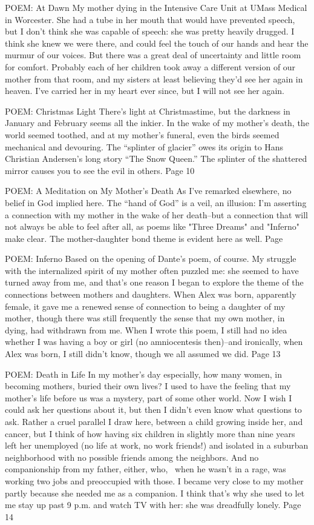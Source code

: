 POEM: At Dawn
My mother dying in the Intensive Care Unit at UMass Medical in Worcester. She had a tube in her mouth that would have prevented speech, but I don't think she was capable of speech: she was pretty heavily drugged. I think she knew we were there, and could feel the touch of our hands and hear the murmur of our voices. But there was a great deal of uncertainty and little room for comfort. Probably each of her children took away a different version of our mother from that room, and my sisters at least believing they'd see her again in heaven. I've carried her in my heart ever since, but I will not see her again. \pageref{chap:nxref:1}

POEM: Christmas Light
There's light at Christmastime, but the darkness in January and February seems all the inkier. In the wake of my mother's death, the world seemed toothed, and at my mother's funeral, even the birds seemed mechanical and devouring. The ``splinter of glacier'' owes its origin to Hans Christian Andersen's long story ``The Snow Queen.'' The splinter of the shattered mirror causes you to see the evil in others.
Page 10

POEM: A Meditation on My Mother's Death
As I've remarked elsewhere, no belief in God implied here. The ``hand of God'' is a veil, an illusion: I'm asserting a connection with my mother in the wake of her death--but a connection that will not always be able to feel after all, as poems like "Three Dreams" and "Inferno" make clear. The mother-daughter bond theme is evident here as well. Page \pageref{ch:ameditation}

POEM: Inferno
Based on the opening of Dante's poem, of course. My struggle with the internalized spirit of my mother often puzzled me: she seemed to have turned away from me, and that's one reason I began to explore the theme of the connections between mothers and daughters. When Alex was born, apparently female, it gave me a renewed sense of connection to being a daughter of my mother, though there was still frequently the sense that my own mother, in dying, had withdrawn from me. When I wrote this poem, I still had no idea whether I was having a boy or girl (no amniocentesis then)--and ironically, when Alex was born, I still didn't know, though we all assumed we did. Page 13


POEM: Death in Life
In my mother's day especially, how many women, in becoming mothers, buried their own lives? I used to have the feeling that my mother's life before us was a mystery, part of some other world. Now I wish I could ask her questions about it, but then I didn't even know what questions to ask. Rather a cruel parallel I draw here, between a child growing inside her, and cancer, but I think of how having six children in slightly more than nine years left her unemployed (no life at work, no work friends!) and isolated in a suburban neighborhood with no possible friends among the neighbors. And no companionship from my father, either, who,  when he wasn't in a rage, was working two jobs and preoccupied with those. I became very close to my mother partly because she needed me as a companion. I think that's why she used to let me stay up past 9 p.m. and watch TV with her: she was dreadfully lonely. Page 14

